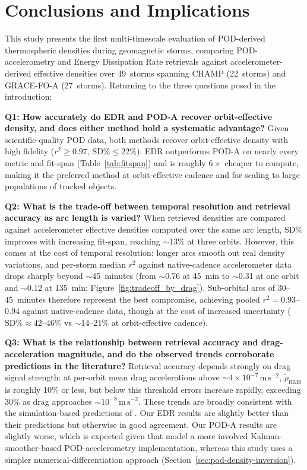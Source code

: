 \documentclass{agujournal2019}
\begin{document}
\section{Conclusions and Implications}

This study presents the first multi-timescale evaluation of POD-derived
thermospheric densities during geomagnetic storms, comparing POD-accelerometry
and Energy Dissipation Rate retrievals against accelerometer-derived effective
densities over 49~storms spanning CHAMP (22~storms) and GRACE-FO-A
(27~storms). Returning to the three questions posed in the introduction:

\textbf{Q1: How accurately do EDR and POD-A recover orbit-effective density, and does either method hold a systematic advantage?}
Given scientific-quality POD data, both methods recover orbit-effective
density with high fidelity ($r^{2} \geq 0.97$, $\text{SD\%} \leq 22\%$).
EDR outperforms POD-A on nearly every metric and fit-span
(Table~\ref{tab:fitspan}) and is roughly $6\times$ cheaper to compute,
making it the preferred method at orbit-effective cadence and for scaling
to large populations of tracked objects.

\textbf{Q2: What is the trade-off between temporal resolution and retrieval accuracy as arc length is varied?}
When retrieved densities are compared against accelerometer effective
densities computed over the same arc length, $\text{SD\%}$ improves
with increasing fit-span, reaching $\sim$13\% at three orbits. However,
this comes at the cost of temporal resolution: longer arcs smooth out
real density variations, and per-storm median $r^{2}$ against native-cadence accelerometer
data drops sharply beyond $\sim$45~minutes (from $\sim$0.76 at 45~min
to $\sim$0.31 at one orbit and $\sim$0.12 at 135~min;
Figure~\ref{fig:tradeoff_by_drag}).
Sub-orbital arcs of 30--45~minutes therefore represent the best
compromise, achieving pooled $r^{2} = 0.93$--$0.94$ against native-cadence
data, though at the cost of increased uncertainty
($\text{SD\%} \approx 42$--$46\%$ vs $\sim$14--21\% at orbit-effective
cadence).

\textbf{Q3: What is the relationship between retrieval accuracy and drag-acceleration magnitude, and do the observed trends corroborate predictions in the literature?}
Retrieval accuracy depends strongly on drag signal strength: at per-orbit
mean drag accelerations above $\sim$$4 \times 10^{-7}\,\mathrm{m\,s^{-2}}$,
$\tilde{\rho}_{\text{RMS}}$ is roughly 10\% or less, but below this
threshold errors increase rapidly, exceeding 30\% as drag approaches
$\sim$$10^{-8}\,\mathrm{m\,s^{-2}}$. These trends are broadly consistent
with the simulation-based predictions of .
Our EDR results are slightly better than their predictions but
otherwise in good agreement. Our POD-A results are slightly worse,
which is expected given that  model a
more involved Kalman-smoother-based POD-accelerometry implementation,
whereas this study uses a simpler numerical-differentiation approach
(Section~\ref{sec:pod-density-inversion}).
\end{document}

